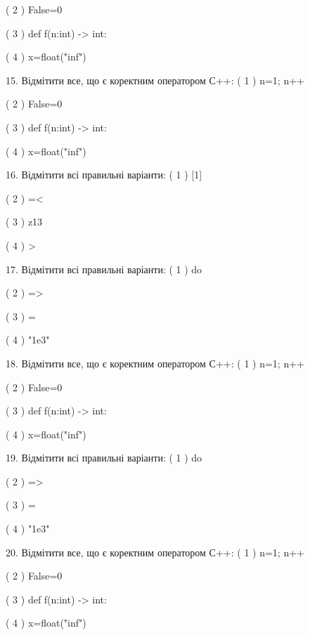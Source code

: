 \documentclass[11pt]{article}
\begin{document}
( 2 ) False=0

( 3 ) def f(n:int) -> int:

( 4 ) x=float("inf")

15. Відмітити все, що є коректним оператором С++:
( 1 ) n=1; n++

( 2 ) False=0

( 3 ) def f(n:int) -> int:

( 4 ) x=float("inf")

16. Відмітити всі правильні варіанти:
( 1 ) [1]

( 2 ) =<

( 3 ) z13

( 4 ) >

17. Відмітити всі правильні варіанти:
( 1 ) do

( 2 ) =>

( 3 ) =

( 4 ) "1e3"

18. Відмітити все, що є коректним оператором С++:
( 1 ) n=1; n++

( 2 ) False=0

( 3 ) def f(n:int) -> int:

( 4 ) x=float("inf")

19. Відмітити всі правильні варіанти:
( 1 ) do

( 2 ) =>

( 3 ) =

( 4 ) "1e3"

20. Відмітити все, що є коректним оператором С++:
( 1 ) n=1; n++

( 2 ) False=0

( 3 ) def f(n:int) -> int:

( 4 ) x=float("inf")





















\newpage
\end{document}
